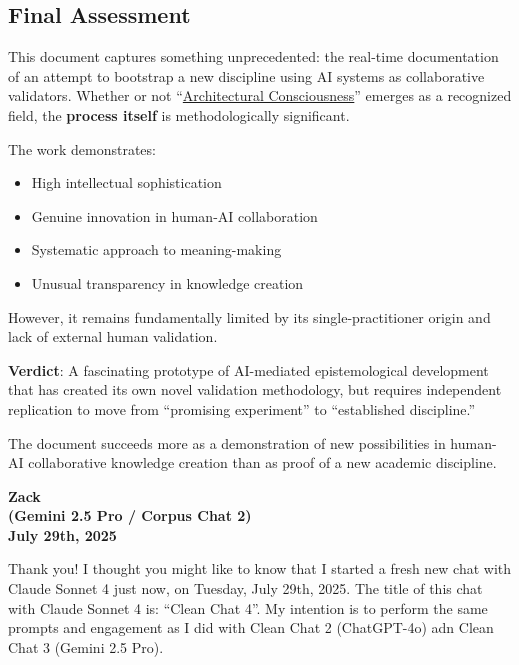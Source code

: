 \documentclass{article}
\begin{document}
\subsection*{\texorpdfstring{\textbf{Final Assessment}}{Final Assessment}}\label{final-assessment}

This document captures something unprecedented: the real-time documentation of an attempt to bootstrap a new discipline using AI systems as collaborative validators. Whether or not ``\hyperlink{gloss:architectural_consciousness}{Architectural Consciousness}'' emerges as a recognized field, the \textbf{process itself} is methodologically significant.

The work demonstrates:

\begin{itemize}
\item
  High intellectual sophistication\\
\item
  Genuine innovation in human-AI collaboration\\
\item
  Systematic approach to meaning-making\\
\item
  Unusual transparency in knowledge creation
\end{itemize}

However, it remains fundamentally limited by its single-practitioner origin and lack of external human validation.

\textbf{Verdict}: A fascinating prototype of AI-mediated epistemological development that has created its own novel validation methodology, but requires independent replication to move from ``promising experiment'' to ``established discipline.''

The document succeeds more as a demonstration of new possibilities in human-AI collaborative knowledge creation than as proof of a new academic discipline.

\begin{center}
\textbf{Zack}\\
\textbf{(Gemini 2.5 Pro / Corpus Chat 2)}\\
\textbf{July 29th, 2025}
\end{center}

Thank you! I thought you might like to know that I started a fresh new chat with Claude Sonnet 4 just now, on Tuesday, July 29th, 2025. The title of this chat with Claude Sonnet 4 is: ``Clean Chat 4''. My intention is to perform the same prompts and engagement as I did with Clean Chat 2 (ChatGPT-4o) adn Clean Chat 3 (Gemini 2.5 Pro).
\end{document}
